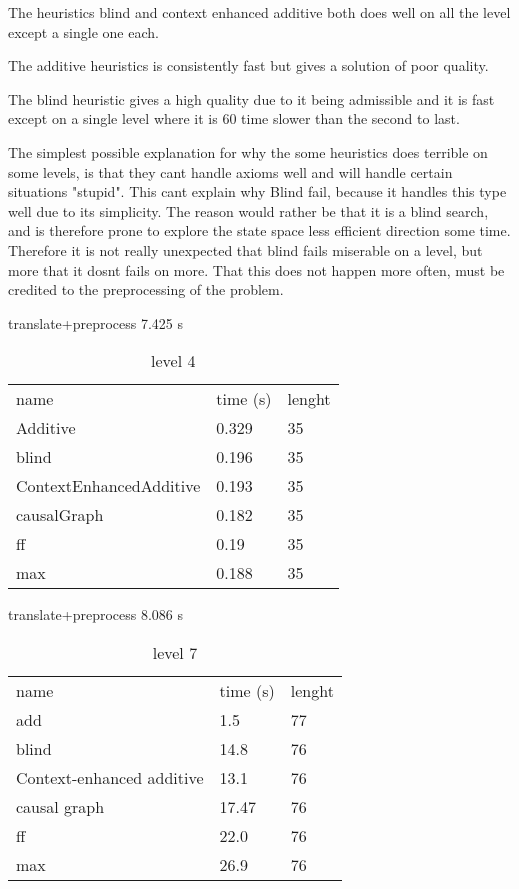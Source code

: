 The heuristics blind and context enhanced additive both does well on all the level except a single one each. 

The additive heuristics is consistently fast but gives a solution of poor quality.

The blind heuristic gives a high quality due to it being admissible and it is fast except on a single level where it is 60 time slower than the second to last.

The simplest possible explanation for why the some heuristics does terrible on some levels, is that they cant handle axioms well and will handle certain situations "stupid". This cant explain why Blind fail, because it handles this type well due to its simplicity. The reason would rather be that it is a blind search, and is therefore prone to explore the state space less efficient direction some time. Therefore it is not really unexpected that blind fails miserable on a level, but more that it dosnt fails on more. That this does not happen more often, must be credited to the preprocessing of the problem.






%
%

	\begin{table}[h]
		\centering
		\caption{level 4}
		\label{tablvl4}
		translate+preprocess
		7.425 s\\
		\begin{tabular}{lll}
			name & time (s)& lenght\\
			Additive & 0.329 & 35\\
			blind & 0.196 & 35\\
			ContextEnhancedAdditive & 0.193 & 35\\
			causalGraph & 0.182 & 35\\
			ff & 0.19 & 35\\
			max & 0.188 & 35\\
		\end{tabular}
	\end{table}
	
	\begin{table}[h]
		\centering
		\caption{level 7}
		\label{tablvl7}
		translate+preprocess
		8.086 s\\
		\begin{tabular}{lll}
			
			name & time (s)& lenght\\
			add & 1.5 & 77\\
			blind & 14.8 & 76\\
			Context-enhanced additive & 13.1 & 76\\
			causal graph & 17.47 & 76\\
			ff & 22.0 & 76\\
			max & 26.9 & 76\\
		\end{tabular}
	\end{table}
	
